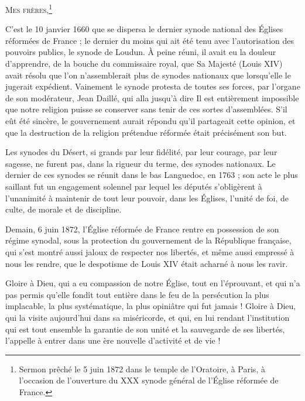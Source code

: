 \addchap{}

{\chapfont\Large\scshape{\Huge M}es frères,\footnote{Sermon prêché le 5 juin 1872 dans le temple de l’Oratoire, à Paris, à l’occasion de l'ouverture du XXX synode général de l'Église réformée de France.}}

C’est le 10 janvier 1660 que se dispersa le dernier synode national des Églises réformées de France ; le dernier du moins qui ait été tenu avec l’autorisation des pouvoirs publics, le synode de Loudun. À peine réuni, il avait eu la douleur d’apprendre, de la bouche du commissaire royal, que Sa Majesté (Louis XIV) avait résolu \Og{} que l’on n’assemblerait plus de synodes nationaux que lorsqu’elle le jugerait expédient\Fg{}. Vainement le synode protesta de toutes ses forces, par l’organe de son modérateur, Jean Daillé, qui alla jusqu’à dire\frcolon{} \Og{} Il est entièrement impossible que notre religion puisse se conserver sans tenir de ces sortes d’assemblées.\Fg{} S’il eût été sincère, le gouvernement aurait répondu qu’il partageait cette opinion, et que la destruction de la religion \Og{} prétendue réformée\Fg{} était précisément son but.

Les synodes du Désert, si grands par leur fidélité, par leur courage, par leur sagesse, ne furent pas, dans la rigueur du terme, des synodes nationaux. Le dernier de ces synodes se réunit dans le bas Languedoc, en 1763 ; son acte le plus saillant fut un engagement solennel par lequel les députés s’obligèrent à l’unanimité à maintenir de tout leur pouvoir, dans les Églises, l’unité de foi, de culte, de morale et de discipline.

Demain, 6 juin 1872, l’Église réformée de France rentre en possession de son régime synodal, sous la protection du gouvernement de la République française, qui s’est montré aussi jaloux de respecter nos libertés, et même aussi empressé à nous les rendre, que le despotisme de Louis XIV était acharné à nous les ravir.

Gloire à Dieu, qui a eu compassion de notre Église, tout en l’éprouvant, et qui n’a pas permis qu’elle fondît tout entière dans le feu de la persécution la plus implacable, la plus systématique, la plus opiniâtre qui fut jamais ! Gloire à Dieu, qui la visite aujourd’hui dans sa miséricorde, et qui, en lui rendant l’institution qui est tout ensemble la garantie de son unité et la sauvegarde de ses libertés, l’appelle à entrer dans une ère nouvelle d’activité et de vie !

